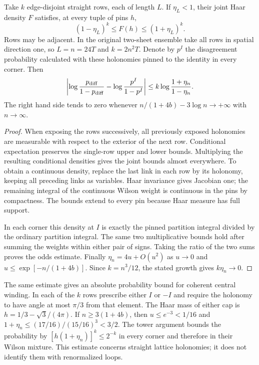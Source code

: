 \begin{proposition}\label{cl:prop:row-pins}
Take $k$ edge-disjoint straight rows, each of length $L$. If $\eta_L<1$,
their joint Haar density $F$ satisfies, at every tuple of pins $h$,
\[
 (1-\eta_L)^k\le F(h)\le(1+\eta_L)^k.
\]
Rows may be adjacent. In the original two-sheet ensemble take all rows
in spatial direction one, so $L=n=24T$ and $k=2n^2T$. Denote by $p^I$
the disagreement probability calculated with these holonomies pinned
to the identity in every corner. Then
\[
 \left|\log\frac{p_{\rm diff}}{1-p_{\rm diff}}-
             \log\frac{p^I}{1-p^I}\right|
 \le k\log\frac{1+\eta_n}{1-\eta_n}.
\]
The right hand side tends to zero whenever
$n/(1+4b)-3\log n\longrightarrow+\infty$ with $n\to\infty$.
\end{proposition}
\begin{proof}
When exposing the rows successively, all previously exposed holonomies
are measurable with respect to the exterior of the next row. Conditional
expectation preserves the single-row upper and lower bounds. Multiplying
the resulting conditional densities gives the joint bounds almost
everywhere. To obtain a continuous density, replace the last link in
each row by its holonomy, keeping all preceding links as variables.
Haar invariance gives Jacobian one; the remaining integral of the continuous
Wilson weight is continuous in the pins by compactness. The bounds extend
to every pin because Haar measure has full support.

In each corner this density at $I$ is exactly the pinned partition
integral divided by the ordinary partition integral. The same two
multiplicative bounds hold after summing the weights within either pair
of signs. Taking the ratio of the two sums proves the odds estimate.
Finally $\eta_n=4u+O(u^2)$ as $u\to0$ and
$u\le\exp[-n/(1+4b)]$. Since $k=n^3/12$, the stated growth gives
$k\eta_n\to0$.
\end{proof}

The same estimate gives an absolute probability bound for coherent
central winding. In each of the $k$ rows prescribe either $I$ or $-I$
and require the holonomy to have angle at most $\pi/3$ from that
element. The Haar mass of either cap is
$h=1/3-\sqrt3/(4\pi)$. If $n\ge3(1+4b)$, then $u\le e^{-3}<1/16$
and $1+\eta_n\le(17/16)/(15/16)^3<3/2$. The tower argument bounds
the probability by $[h(1+\eta_n)]^k\le 2^{-k}$ in every corner and
therefore in their Wilson mixture. This estimate concerns straight
lattice holonomies; it does not identify them with renormalized loops.

